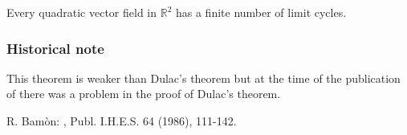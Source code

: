 \documentclass[12pt]{article}
\begin{document}

Every quadratic vector field in $\mathbb{R}^2$ has a finite number of limit cycles.\cite{BR}

\subsubsection*{Historical note}
This theorem is weaker than Dulac's theorem but at the time of the publication of \cite{BR} there was a problem in the proof of Dulac's theorem.

\begin{thebibliography}{1}
 R. Bam\`on: , Publ. I.H.E.S. 64 (1986), 111-142.
\end{thebibliography}
\end{document}
